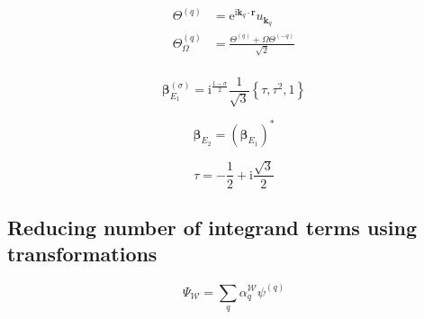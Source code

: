 \begin{align*}
    \Theta^{(q)}
    & =
    \mathrm{e}^{\mathrm{i}\bm{k}_q\cdot \bm{r}}u_{\bm{k}_q}
    \\
    \Theta_{\Omega}^{(q)}
    & =
    \frac
    {
    \Theta^{(q)}
    +
    \Omega\Theta^{(-q)}
    }
    {\sqrt{2}}
    \\
\end{align*}

\begin{equation*}
    \bm{\beta}_{E_{1}}^{(\sigma)}
    =
    \mathrm{i}^{\frac{1-\sigma}{2}}
    \frac{1}{\sqrt{3}}
    \left\{\tau, \tau^{2}, 1\right\}
\end{equation*}

\begin{equation*}
    \bm{\beta}_{E_{2}}
    =
    \left(\bm{\beta}_{E_{1}}\right)^{*}
\end{equation*}

\begin{equation*}
    \tau = -\frac{1}{2} + \mathrm{i}\frac{\sqrt{3}}{2}
\end{equation*}

\pagebreak

\subsection{Reducing number of integrand terms using transformations}

\begin{equation}
    \Psi_{\mathcal{W}}
    =
    \sum_{q}
    \alpha_{q}^{\mathcal{W}}\psi^{(q)}
\end{equation}


